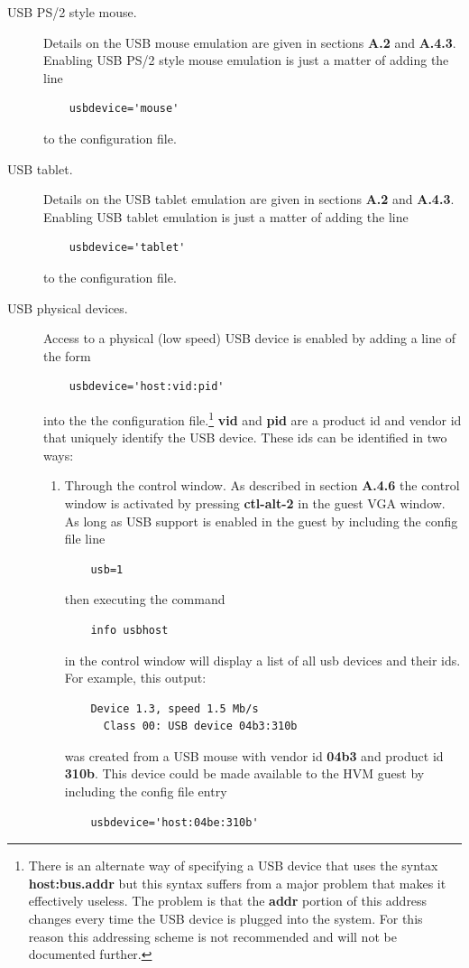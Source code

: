 \documentclass[11pt,twoside,final,openright]{report}
\begin{document}
\begin{description}
\item[USB PS/2 style mouse.]
Details on the USB mouse emulation are
given in sections
\textbf{A.2}
and
\textbf{A.4.3}.
Enabling USB PS/2 style mouse emulation
is just a matter of adding the line

{\small
\begin{verbatim}
    usbdevice='mouse'
\end{verbatim}
}

to the configuration file.
\item[USB tablet.]
Details on the USB tablet emulation are
given in sections
\textbf{A.2}
and
\textbf{A.4.3}.
Enabling USB tablet emulation
is just a matter of adding the line

{\small
\begin{verbatim}
    usbdevice='tablet'
\end{verbatim}
}

to the configuration file.
\item[USB physical devices.]
Access to a physical (low speed) USB device
is enabled by adding a line of the form

{\small
\begin{verbatim}
    usbdevice='host:vid:pid'
\end{verbatim}
}

into the the configuration file.\footnote{
There is an alternate
way of specifying a USB device that
uses the syntax
\textbf{host:bus.addr}
but this syntax suffers from
a major problem that makes
it effectively useless.
The problem is that the
\textbf{addr}
portion of this address
changes every time the USB device
is plugged into the system.
For this reason this addressing
scheme is not recommended and
will not be documented further.
}
\textbf{vid}
and
\textbf{pid}
are a
product id and
vendor id
that uniquely identify
the USB device.
These ids can be identified
in two ways:

\begin{enumerate}
\item Through the control window.
As described in section
\textbf{A.4.6}
the control window
is activated by pressing
\textbf{ctl-alt-2}
in the guest VGA window.
As long as USB support is
enabled in the guest by including
the config file line
{\small
\begin{verbatim}
    usb=1
\end{verbatim}
}
then executing the command
{\small
\begin{verbatim}
    info usbhost
\end{verbatim}
}
in the control window
will display a list of all
usb devices and their ids.
For example,
this output:
{\small
\begin{verbatim}
    Device 1.3, speed 1.5 Mb/s
      Class 00: USB device 04b3:310b
\end{verbatim}
}
was created from a USB mouse with
vendor id
\textbf{04b3}
and product id
\textbf{310b}.
This device could be made available
to the HVM guest by including the
config file entry
{\small
\begin{verbatim}
    usbdevice='host:04be:310b'
\end{verbatim}
}


\end{enumerate}
\end{description}
\end{document}
